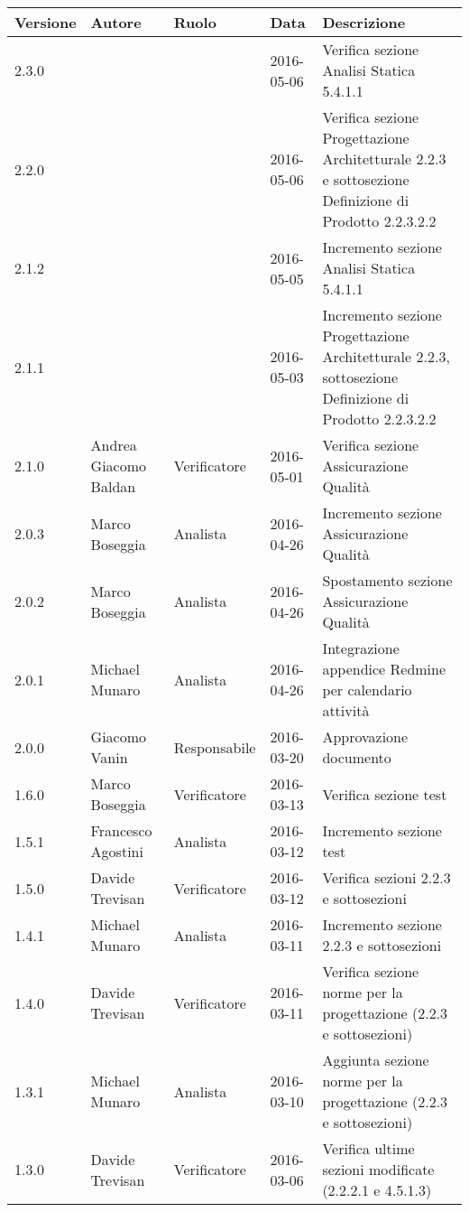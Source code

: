 \documentclass{scalatekids-article}
\begin{document}
\begin{center}
  \begin{longtable}{| l | l | l | l | p{5cm} |}
    \hline
    Versione & Autore & Ruolo & Data & Descrizione \\
    \hline
    2.3.0 & & & 2016-05-06 & Verifica sezione Analisi Statica 5.4.1.1\\
    \hline
    2.2.0 & & & 2016-05-06 & Verifica sezione Progettazione Architetturale 2.2.3 e sottosezione Definizione di Prodotto 2.2.3.2.2\\
    \hline
    2.1.2 & & & 2016-05-05 & Incremento sezione Analisi Statica 5.4.1.1\\
    \hline
    2.1.1 & & & 2016-05-03 & Incremento sezione Progettazione Architetturale 2.2.3, sottosezione Definizione di Prodotto 2.2.3.2.2\\
    \hline
    2.1.0 & Andrea Giacomo Baldan & Verificatore & 2016-05-01 & Verifica sezione Assicurazione Qualità\\
    \hline
    2.0.3 & Marco Boseggia & Analista & 2016-04-26 & Incremento sezione Assicurazione Qualità \\
    \hline
    2.0.2 & Marco Boseggia & Analista & 2016-04-26 & Spostamento sezione Assicurazione Qualità \\
    \hline
    2.0.1 & Michael Munaro & Analista & 2016-04-26 & Integrazione appendice Redmine per calendario attività \\
    \hline
    2.0.0 & Giacomo Vanin & Responsabile & 2016-03-20 & Approvazione documento\\
    \hline
    1.6.0 & Marco Boseggia & Verificatore & 2016-03-13 & Verifica sezione test\\
    \hline
    1.5.1 & Francesco Agostini & Analista & 2016-03-12 & Incremento sezione test\\
    \hline
    1.5.0 & Davide Trevisan & Verificatore & 2016-03-12 & Verifica sezioni 2.2.3 e sottosezioni\\
    \hline
    1.4.1 & Michael Munaro & Analista & 2016-03-11 & Incremento sezione 2.2.3 e sottosezioni\\
    \hline
    1.4.0 & Davide Trevisan & Verificatore & 2016-03-11 & Verifica sezione norme per la progettazione (2.2.3 e sottosezioni)\\
    \hline
    1.3.1 & Michael Munaro & Analista & 2016-03-10 & Aggiunta sezione norme per la progettazione (2.2.3 e sottosezioni)\\
    \hline
    1.3.0 & Davide Trevisan & Verificatore & 2016-03-06 & Verifica ultime sezioni modificate (2.2.2.1 e 4.5.1.3)\\

\end{longtable}
\end{center}
\end{document}
